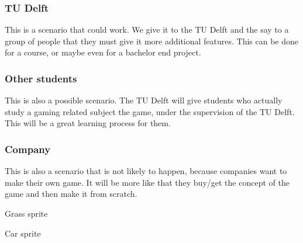 \documentclass[11pt,twoside,a4paper]{article}
\begin{document}
\subsubsection{TU Delft}
This is a scenario that could work. We give it to the TU Delft and the say to a group of people that they must give it more additional features. This can be done for a course, or maybe even for a bachelor end project.
\subsubsection{Other students}
This is also a possible scenario. The TU Delft will give students who actually study a gaming related subject the game, under the supervision of the TU Delft. This will be a great learning process for them.
\subsubsection{Company}
This is also a scenario that is not likely to happen, because companies want to make their own game. It will be more like that they buy/get the concept of the game and then make it from scratch.

\newpage

\begin{thebibliography}{10}

Grass sprite

Car sprite

\end{thebibliography}
\end{document}
